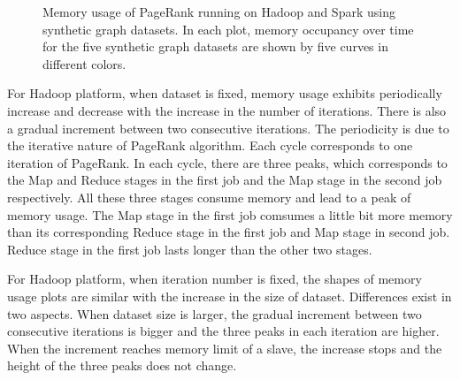 \documentclass[12pt,conference,letterpaper]{IEEEtran}
\begin{document}
\begin{figure}[!t]
  \centering
  \caption{Memory usage of PageRank running on Hadoop and Spark using synthetic graph datasets. In each plot, memory occupancy over time for the five synthetic graph datasets are shown by five curves in different colors.}
  \label{fig:time_memory_syn} 
\end{figure}

For Hadoop platform, when dataset is fixed, memory usage exhibits periodically increase and decrease with the increase in the number of iterations. There is also a gradual increment between two consecutive iterations. The periodicity is due to the iterative nature of PageRank algorithm. Each cycle corresponds to one iteration of PageRank. In each cycle, there are three peaks, which corresponds to the Map and Reduce stages in the first job and the Map stage in the second job respectively. All these three stages consume memory and lead to a peak of memory usage. The Map stage in the first job comsumes a little bit more memory than its corresponding Reduce stage in the first job and Map stage in second job. Reduce stage in the first job lasts longer than the other two stages. 

For Hadoop platform, when iteration number is fixed, the shapes of memory usage plots are similar with the increase in the size of dataset. Differences exist in two aspects. When dataset size is larger, the gradual increment between two consecutive iterations is bigger and the three peaks in each iteration are higher. When the increment reaches memory limit of a slave, the increase stops and the height of the three peaks does not change.
\end{document}
